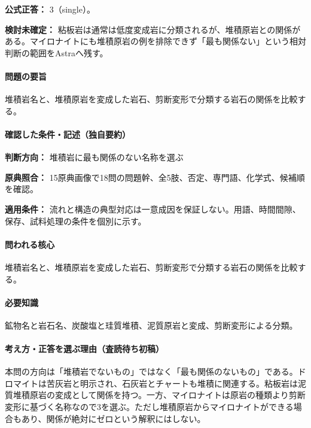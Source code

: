 \textbf{公式正答：} 3（single）。

\par\textbf{検討未確定：} 粘板岩は通常は低度変成岩に分類されるが、堆積原岩との関係がある。マイロナイトにも堆積原岩の例を排除できず「最も関係ない」という相対判断の範囲をAstraへ残す。

\paragraph{問題の要旨} 堆積岩名と、堆積原岩を変成した岩石、剪断変形で分類する岩石の関係を比較する。

\paragraph{確認した条件・記述（独自要約）}\mbox{}\par

\noindent\textbf{判断方向：} 堆積岩に最も関係のない名称を選ぶ\par

\noindent\textbf{原典照合：} 15原典画像で18問の問題幹、全5肢、否定、専門語、化学式、候補順を確認。\par

\noindent\textbf{適用条件：} 流れと構造の典型対応は一意成因を保証しない。用語、時間間隙、保存、試料処理の条件を個別に示す。\par

\paragraph{問われる核心} 堆積岩名と、堆積原岩を変成した岩石、剪断変形で分類する岩石の関係を比較する。

\paragraph{必要知識} 鉱物名と岩石名、炭酸塩と珪質堆積、泥質原岩と変成、剪断変形による分類。

\paragraph{考え方・正答を選ぶ理由（査読待ち初稿）} 本問の方向は「堆積岩でないもの」ではなく「最も関係のないもの」である。ドロマイトは苦灰岩と明示され、石灰岩とチャートも堆積に関連する。粘板岩は泥質堆積原岩の変成として関係を持つ。一方、マイロナイトは原岩の種類より剪断変形に基づく名称なので3を選ぶ。ただし堆積原岩からマイロナイトができる場合もあり、関係が絶対にゼロという解釈にはしない。

